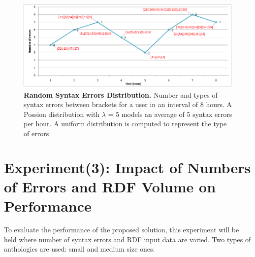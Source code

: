 	\begin{figure}[ht]
	\begin{center}
		\includegraphics[scale=0.58,angle=0]{images/experiment2.png}
				\setlength\belowcaptionskip{-7mm}
		\caption{\textbf{Random Syntax Errors Distribution.} Number and types of syntax errors between brackets for a user in an interval of 8 hours. A Possion distribution with $\lambda$ = 5 models an average of 5 syntax errors per hour. A uniform distribution is computed to represent the type of errors} 
		\label{Fig:experiment2}
	\end{center}
\end{figure}
\section{Experiment(3): Impact of Numbers of Errors and RDF Volume on Performance }
To evaluate the performance of the proposed solution, this experiment will be held where number of syntax errors and RDF input data are varied. Two types of anthologies are used: small and medium size ones.  









